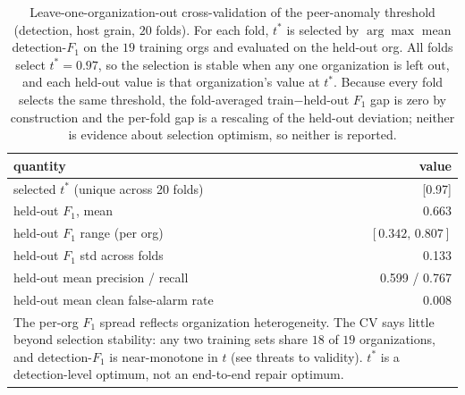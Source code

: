 \begin{table}[t]\centering\small
\caption{Leave-one-organization-out cross-validation of the peer-anomaly threshold (detection, host grain, $20$ folds). For each fold, $t^\ast$ is selected by $\arg\max$ mean detection-$F_1$ on the $19$ training orgs and evaluated on the held-out org. All folds select $t^\ast\!=\!0.97$, so the selection is stable when any one organization is left out, and each held-out value is that organization's value at $t^\ast$. Because every fold selects the same threshold, the fold-averaged train$-$held-out $F_1$ gap is zero by construction and the per-fold gap is a rescaling of the held-out deviation; neither is evidence about selection optimism, so neither is reported.}
\label{tab:threshold-cv}
\begin{tabular}{lr}\toprule
quantity & value\\\midrule
selected $t^\ast$ (unique across 20 folds) & [0.97]\\
held-out $F_1$, mean & 0.663\\
\quad held-out $F_1$ range (per org) & $[0.342,\,0.807]$\\
\quad held-out $F_1$ std across folds & 0.133\\
held-out mean precision / recall & 0.599 / 0.767\\
held-out mean clean false-alarm rate & 0.008\\
\midrule
\multicolumn{2}{p{.82\linewidth}}{\footnotesize The per-org $F_1$ spread reflects organization heterogeneity. The CV says little beyond selection stability: any two training sets share $18$ of $19$ organizations, and detection-$F_1$ is near-monotone in $t$ (see threats to validity). $t^\ast$ is a detection-level optimum, not an end-to-end repair optimum.}\\
\bottomrule\end{tabular}\end{table}
